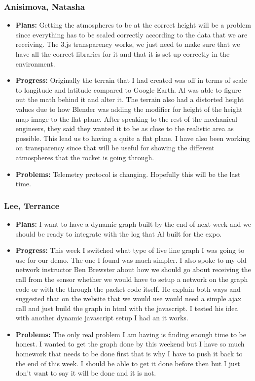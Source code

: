 \documentclass[10pt,draftclsnofoot,onecolumn]{IEEEtran}
\begin{document}
\subsubsection{Anisimova, Natasha}
\begin{itemize}
	\item \textbf{Plans: }Getting the atmospheres to be at the correct height will be a problem since everything has to be scaled correctly according to the data that we are receiving. The 3.js transparency works, we just need to make sure that we have all the correct libraries for it and that it is set up correctly in the environment.
	\item \textbf{Progress:} Originally the terrain that I had created was off in terms of scale to longitude and latitude compared to Google Earth. Al was able to figure out the math behind it and alter it. The terrain also had a distorted height values due to how Blender was adding the modifier for height of the height map image to the flat plane. After speaking to the rest of the mechanical engineers, they said they wanted it to be as close to the realistic area as possible. This lead us to having a quite a flat plane. I have also been working on transparency since that will be useful for showing the different atmospheres that the rocket is going through.
	\item \textbf{Problems: }
	Telemetry protocol is changing. Hopefully this will be the last time.


\end{itemize}

\subsubsection{Lee, Terrance}
\begin{itemize}
	\item \textbf{Plans: }
	I want to have a dynamic graph built by the end of next week and we should be ready to integrate with the log that Al built for the expo.
	\item \textbf{Progress:  }
	This week I switched what type of live line graph I was going to use for our demo. The one I found was much simpler. I also spoke to my old network instructor Ben Brewster about how we should go about receiving the call from the sensor whether we would have to setup a network on the graph code or with the through the packet code itself. He explain both ways and suggested that on the website that we would use would need a simple ajax call and just build the graph in html with the javascript. I tested his idea with another dynamic javascript setup I had an it works.
	\item \textbf{Problems: }
	The only real problem I am having is finding enough time to be honest. I wanted to get the graph done by this weekend but I have so much homework that needs to be done first that is why I have to push it back to the end of this week. I should be able to get it done before then but I just don't want to say it will be done and it is not.
\end{itemize}
\end{document}
